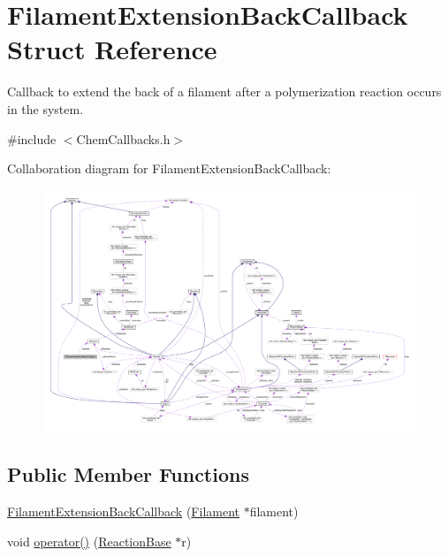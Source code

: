 \hypertarget{structFilamentExtensionBackCallback}{\section{Filament\+Extension\+Back\+Callback Struct Reference}
\label{structFilamentExtensionBackCallback}
}


Callback to extend the back of a filament after a polymerization reaction occurs in the system.  




{\ttfamily \#include $<$Chem\+Callbacks.\+h$>$}



Collaboration diagram for Filament\+Extension\+Back\+Callback\+:\nopagebreak
\begin{figure}[H]
\begin{center}
\leavevmode
\includegraphics[width=350pt]{structFilamentExtensionBackCallback__coll__graph}
\end{center}
\end{figure}
\subsection*{Public Member Functions}
\begin{DoxyCompactItemize}
\item 
\hyperlink{structFilamentExtensionBackCallback_ae25bee5ab1d5a49404cc0bb0bbe6ffc4}{Filament\+Extension\+Back\+Callback} (\hyperlink{classFilament}{Filament} $\ast$filament)
\item 
void \hyperlink{structFilamentExtensionBackCallback_aa88d35776e587996b2a7936b6314f380}{operator()} (\hyperlink{classReactionBase}{Reaction\+Base} $\ast$r)
\end{DoxyCompactItemize}
